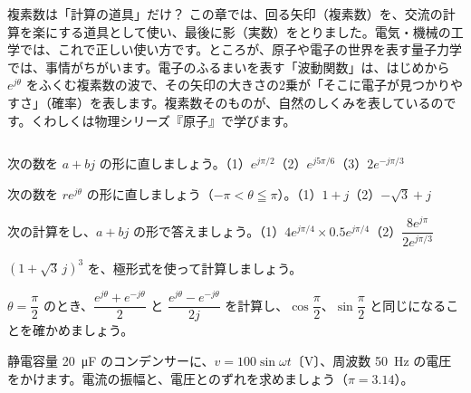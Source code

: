 \begin{column}{複素数は「計算の道具」だけ？}
この章では、回る矢印（複素数）を、交流の計算を楽にする道具として使い、最後に影（実数）をとりました。電気・機械の工学では、これで正しい使い方です。ところが、原子や電子の世界を表す量子力学では、事情がちがいます。電子のふるまいを表す「波動関数」は、はじめから $e^{j\theta}$ をふくむ複素数の波で、その矢印の大きさの2乗が「そこに電子が見つかりやすさ」（確率）を表します。複素数そのものが、自然のしくみを表しているのです。くわしくは物理シリーズ『原子』で学びます。
\end{column}

\bkendproblems
{}

\bkproblem 次の数を $a+bj$ の形に直しましょう。\newline（1）$e^{j\pi/2}$\quad（2）$e^{j5\pi/6}$\quad（3）$2e^{-j\pi/3}$

\bkproblem 次の数を $re^{j\theta}$ の形に直しましょう（$-\pi<\theta\leqq\pi$）。\newline（1）$1+j$\quad（2）$-\sqrt3+j$

\bkproblem 次の計算をし、$a+bj$ の形で答えましょう。\newline（1）$4e^{j\pi/4}\times0.5e^{j\pi/4}$\quad（2）$\dfrac{8e^{j\pi}}{2e^{j\pi/3}}$

\bkproblem $(1+\sqrt3\,j)^3$ を、極形式を使って計算しましょう。

\bkproblem $\theta=\dfrac{\pi}{2}$ のとき、$\dfrac{e^{j\theta}+e^{-j\theta}}{2}$ と $\dfrac{e^{j\theta}-e^{-j\theta}}{2j}$ を計算し、$\cos\dfrac{\pi}{2}$、$\sin\dfrac{\pi}{2}$ と同じになることを確かめましょう。

\bkproblem 静電容量 \qty{20}{\micro F} のコンデンサーに、$v=100\sin\omega t$〔V〕、周波数 \qty{50}{Hz} の電圧をかけます。電流の振幅と、電圧とのずれを求めましょう（$\pi=3.14$）。

